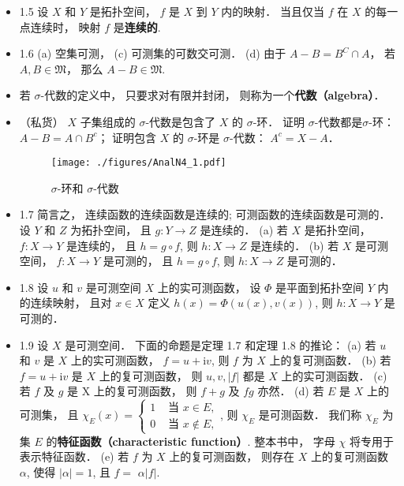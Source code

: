 \begin{itemize}
\item 1.5 设 $X$ 和 $Y$ 是拓扑空间， $f$ 是 $X$ 到 $Y$ 内的映射． 当且仅当 $f$ 在 $X$ 的每一点连续时， 映射 $f$ 是\textbf{连续的}.

\item 1.6 (a) 空集可测， (c) 可测集的可数交可测． (d) 由于 $A-B = B^C\cap A$， 若 $A,B \in \mathfrak{M}$， 那么 $A-B\in \mathfrak{M}$.

\item 若 $\sigma$-代数的定义中， 只要求对有限并封闭， 则称为一个\textbf{代数（algebra）}．

\item （私货） $X$ 子集组成的 $\sigma$-代数是包含了 $X$ 的 $\sigma$-环． 证明 $\sigma$-代数都是$\sigma$-环： $A-B = A\cap B^c$； 证明包含 $X$ 的 $\sigma$-环是 $\sigma$-代数： $A^c = X-A$．

\begin{figure}[ht]
\centering
\texttt{[image: ./figures/AnalN4\_1.pdf]}
\caption{$\sigma$-环和 $\sigma$-代数} \label{AnalN4_fig1}
\end{figure}

\item 1.7 简言之， 连续函数的连续函数是连续的; 可测函数的连续函数是可测的． 设 $Y$ 和 $Z$ 为拓扑空间， 且 $g: Y \rightarrow Z$ 是连续的． (a) 若 $X$ 是拓扑空间， $f: X \rightarrow Y$ 是连续的， 且 $h=g \circ f$, 则 $h: X \rightarrow Z$ 是连续的． (b) 若 $X$ 是可测空间， $f: X \rightarrow Y$ 是可测的， 且 $h=g \circ f$, 则 $h: X \rightarrow Z$ 是可测的． 

\item 1.8 设 $u$ 和 $v$ 是可测空间 $X$ 上的实可测函数， 设 $\Phi$ 是平面到拓扑空间 $Y$ 内的连续映射， 且对 $x \in X$ 定义 $h(x)=\Phi(u(x), v(x))$, 则 $h: X \rightarrow Y$ 是可测的．

\item 1.9 设 $X$ 是可测空间． 下面的命题是定理 1.7 和定理 1.8 的推论：
(a) 若 $u$ 和 $v$ 是 $X$ 上的实可测函数， $f=u+\mathrm{i} v$, 则 $f$ 为 $X$ 上的复可测函数． 
(b) 若 $f=u+\mathrm{i} v$ 是 $X$ 上的复可测函数， 则 $u, v,|f|$ 都是 $X$ 上的实可测函数． 
(c) 若 $f$ 及 $g$ 是 $\mathrm{X}$ 上的复可测函数， 则 $f+g$ 及 $f g$ 亦然．
(d) 若 $E$ 是 $X$ 上的可测集， 且 $\chi_{E}(x)= \begin{cases}1 & \text { 当 } x \in E, \\ 0 & \text { 当 } x \notin E,\end{cases}$, 则 $\chi_{E}$ 是可测函数． 我们称 $\chi_{E}$ 为集 $E$ 的\textbf{特征函数（characteristic function）}. 整本书中， 字母 $\chi$ 将专用于表示特征函数．
(e) 若 $f$ 为 $X$ 上的复可测函数， 则存在 $X$ 上的复可测函数 $\alpha$, 使得 $|\alpha|=1$, 且 $f=$ $\alpha|f|$.


\end{itemize}
